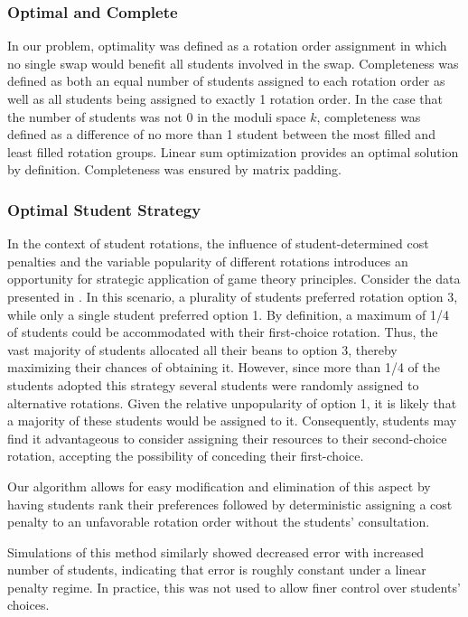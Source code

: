\documentclass{article}
\begin{document}
\subsubsection{Optimal and Complete}
In our problem, optimality was defined as a rotation order assignment in which no single swap would benefit all students involved in the swap. Completeness was defined as both an equal number of students assigned to each rotation order as well as all students being assigned to exactly 1 rotation order. In the case that the number of students was not 0 in the moduli space $k$, completeness was defined as a difference of no more than 1 student between the most filled and least filled rotation groups. Linear sum optimization provides an optimal solution by definition. Completeness was ensured by matrix padding.

\subsubsection{Optimal Student Strategy}
In the context of student rotations, the influence of student-determined cost penalties and the variable popularity of different rotations introduces an opportunity for strategic application of game theory principles. Consider the data presented in . In this scenario, a plurality of students preferred rotation option 3, while only a single student preferred option 1. By definition, a maximum of 1/4 of students could be accommodated with their first-choice rotation. Thus, the vast majority of students allocated all their beans to option 3, thereby maximizing their chances of obtaining it. However, since more than 1/4 of the students adopted this strategy several students were randomly assigned to alternative rotations. Given the relative unpopularity of option 1, it is likely that a majority of these students would be assigned to it. Consequently, students may find it advantageous to consider assigning their resources to their second-choice rotation, accepting the possibility of conceding their first-choice.

Our algorithm allows for easy modification and elimination of this aspect by having students rank their preferences followed by deterministic assigning a cost penalty to an unfavorable rotation order without the students' consultation.

Simulations of this method similarly showed decreased error with increased number of students, indicating that error is roughly constant under a linear penalty regime. In practice, this was not used to allow finer control over students' choices.
\end{document}
